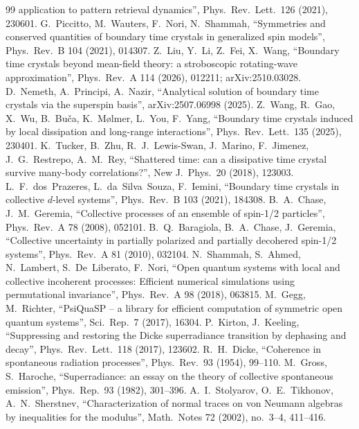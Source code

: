 \documentclass[11pt]{article}
\begin{document}
{\begin{thebibliography}{99}
  application to pattern retrieval dynamics'', Phys.\ Rev.\ Lett.\ 126 (2021), 230601.
 G.~Piccitto, M.~Wauters, F.~Nori, N.~Shammah, ``Symmetries and conserved quantities of
  boundary time crystals in generalized spin models'', Phys.\ Rev.\ B 104 (2021), 014307.
 Z.~Liu, Y.~Li, Z.~Fei, X.~Wang, ``Boundary time crystals beyond mean-field theory: a stroboscopic
  rotating-wave approximation'', Phys.\ Rev.\ A 114 (2026), 012211; arXiv:2510.03028.
 D.~Nemeth, A.~Principi, A.~Nazir, ``Analytical solution of boundary time crystals via the
  superspin basis'', arXiv:2507.06998 (2025).
 Z.~Wang, R.~Gao, X.~Wu, B.~Bu\v{c}a, K.~M{\o}lmer, L.~You, F.~Yang, ``Boundary time crystals
  induced by local dissipation and long-range interactions'', Phys.\ Rev.\ Lett.\ 135 (2025), 230401.
 K.~Tucker, B.~Zhu, R.~J.~Lewis-Swan, J.~Marino, F.~Jimenez, J.~G.~Restrepo, A.~M.~Rey,
  ``Shattered time: can a dissipative time crystal survive many-body correlations?'', New J.\ Phys.\ 20 (2018),
  123003.
 L.~F.~dos~Prazeres, L.~da~Silva~Souza, F.~Iemini, ``Boundary time crystals in collective
  $d$-level systems'', Phys.\ Rev.\ B 103 (2021), 184308.
 B.~A.~Chase, J.~M.~Geremia, ``Collective processes of an ensemble of spin-1/2 particles'',
  Phys.\ Rev.\ A 78 (2008), 052101.
 B.~Q.~Baragiola, B.~A.~Chase, J.~Geremia, ``Collective uncertainty in partially polarized
  and partially decohered spin-1/2 systems'', Phys.\ Rev.\ A 81 (2010), 032104.
 N.~Shammah, S.~Ahmed, N.~Lambert, S.~De~Liberato, F.~Nori, ``Open quantum systems with local
  and collective incoherent processes: Efficient numerical simulations using permutational invariance'',
  Phys.\ Rev.\ A 98 (2018), 063815.
 M.~Gegg, M.~Richter, ``PsiQuaSP -- a library for efficient computation of symmetric open
  quantum systems'', Sci.\ Rep.\ 7 (2017), 16304.
 P.~Kirton, J.~Keeling, ``Suppressing and restoring the Dicke superradiance transition by
  dephasing and decay'', Phys.\ Rev.\ Lett.\ 118 (2017), 123602.
 R.~H.~Dicke, ``Coherence in spontaneous radiation processes'', Phys.\ Rev.\ 93 (1954), 99--110.
 M.~Gross, S.~Haroche, ``Superradiance: an essay on the theory of collective spontaneous
  emission'', Phys.\ Rep.\ 93 (1982), 301--396.
 A.~I.~Stolyarov, O.~E.~Tikhonov, A.~N.~Sherstnev, ``Characterization of normal traces on
  von Neumann algebras by inequalities for the modulus'', Math.\ Notes 72 (2002), no.~3--4, 411--416.

\end{thebibliography}}
\end{document}
